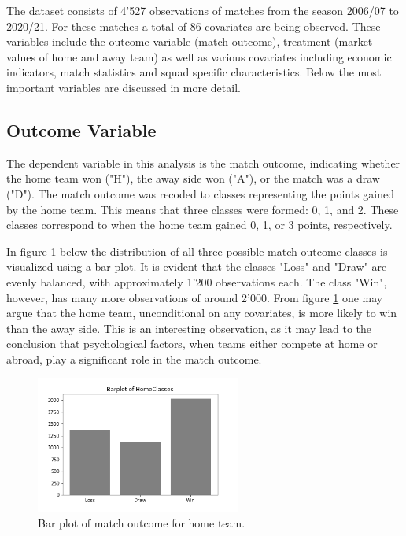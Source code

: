 \documentclass[11pt]{article}
\begin{document}
The dataset consists of 4'527 observations of matches from the season 2006/07 to 2020/21. For these matches a total of 86 covariates are being observed.  These variables include the outcome variable (match outcome), treatment (market values of home and away team) as well as various covariates including economic indicators, match statistics and squad specific characteristics. Below the most important variables are discussed in more detail.

\subsection{Outcome Variable}

The dependent variable in this analysis is the match outcome, indicating whether the home team won ("H"), the away side won ("A"), or the match was a draw ("D").  The match outcome was recoded to classes representing the points gained by the home team. This means that three classes were formed: 0, 1, and 2. These classes correspond to when the home team gained 0, 1, or 3 points, respectively.

In figure \ref{fig:BarPlot} below the distribution of all three possible match outcome classes is visualized using a bar plot. It is evident that the classes "Loss" and "Draw" are evenly balanced, with approximately 1'200 observations each. The class "Win", however, has many more observations of around 2'000. From figure \ref{fig:BarPlot} one may argue that the home team, unconditional on any covariates, is more likely to win than the away side. This is an interesting observation, as it may lead to the conclusion that psychological factors, when teams either compete at home or abroad, play a significant role in the match outcome.

\begin{figure}[ht]
	\centering
	\includegraphics[width=0.6\textwidth]{histogram_of_HomeClasses.png}
	\caption{Bar plot of match outcome for home team.}
	\label{fig:BarPlot}
\end{figure}
\end{document}
